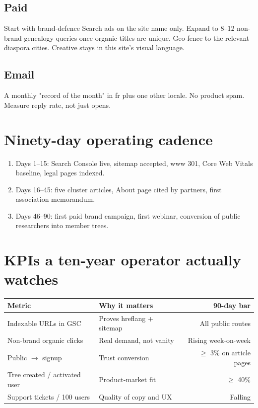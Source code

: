 \documentclass[11pt,a4paper]{article}
\begin{document}
\subsection{Paid}
Start with brand-defence Search ads on the site name only. Expand to 8--12 non-brand genealogy queries once organic titles are unique. Geo-fence to the relevant diaspora cities. Creative stays in this site's visual language.

\subsection{Email}
A monthly "record of the month" in fr plus one other locale. No product spam. Measure reply rate, not just opens.

\section{Ninety-day operating cadence}
\begin{enumerate}[leftmargin=1.4em]
  \item Days 1--15: Search Console live, sitemap accepted, www 301, Core Web Vitals baseline, legal pages indexed.
  \item Days 16--45: five cluster articles, About page cited by partners, first association memorandum.
  \item Days 46--90: first paid brand campaign, first webinar, conversion of public researchers into member trees.
\end{enumerate}

\section{KPIs a ten-year operator actually watches}
\begin{tabularx}{\textwidth}{@{}l X r@{}}
\toprule
\textbf{Metric} & \textbf{Why it matters} & \textbf{90-day bar} \\
\midrule
Indexable URLs in GSC & Proves hreflang + sitemap & All public routes \\
Non-brand organic clicks & Real demand, not vanity & Rising week-on-week \\
Public $\to$ signup & Trust conversion & $\geq$ 3\% on article pages \\
Tree created / activated user & Product-market fit & $\geq$ 40\% \\
Support tickets / 100 users & Quality of copy and UX & Falling \\
\bottomrule
\end{tabularx}
\end{document}
